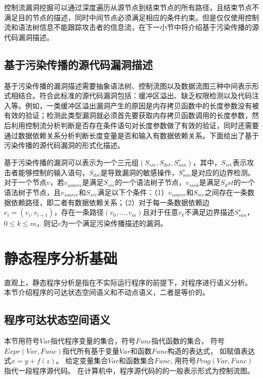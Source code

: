 控制流漏洞挖掘可以通过深度遍历从源节点到结束节点的所有路径，且结束节点不满足目的节点的描述，同时中间节点必须满足相应的条件约束。但是仅仅使用控制流和语法树信息不能跟踪攻击者的信息流，在下一小节中将介绍基于污染传播的源代码漏洞描述。

\subsection{基于污染传播的源代码漏洞描述}

基于污染传播的漏洞描述需要抽象语法树、控制流图以及数据流图三种中间表示形式相结合。符合此标准的源代码漏洞包括：缓冲区溢出、缺乏权限检测以及代码注入等。例如，一类缓冲区溢出漏洞产生的原因是内存拷贝函数中的长度参数没有被有效的验证；检测此类型漏洞就必须首先要获取内存拷贝函数调用的长度参数，然后利用控制流分析判断是否存在条件语句对长度参数做了有效的验证，同时还需要通过数据依赖关系分析判断长度变量是否和输入有数据依赖关系。下面给出了基于污染传播的源代码漏洞的形式化描述。

\begin{definition}
\label{基于污染传播的源代码漏洞描述}
基于污染传播的漏洞可以表示为一个三元组$(S_{src},S_{dst},S^{s}_{san})$，其中，$S_{src}$表示攻击者能够控制的输入语句，$S_{dst}$是导致漏洞的敏感操作，$S^{s}_{san}$是对应的边界检测。对于一个节点$v$，若$v_{source}$是满足$S_{src}$的一个语法树子节点，$v_{sink}$是满足$S_dst$的一个语法树子节点，且$v_{source}$和$S_{src}$满足以下个条件：（1）$v_{source}$和$S_{src}$之间存在一条数据依赖路径，即二者有数据依赖关系；（2）对于每一条数据依赖边$e_i = (v_i, v_{i+1})$，存在一条路径$(v_0,...,v_m)$且对于任意$v_k$不满足边界描述$S^{s}_{san}$，$0 \leq k \leq m$，则记$v$为一个满足污染传播描述的漏洞。
\end{definition}

\section{静态程序分析基础}

直观上，静态程序分析是指在不实际运行程序的前提下，对程序进行语义分析。
本节介绍程序的可达状态空间语义和不动点语义，二者是等价的。

\subsection{程序可达状态空间语义}

本节用符号$Var$指代程序变量的集合，符号$Func$指代函数的集合，
符号$Expr(Var, Func)$指代所有基于变量$Var$和函数$Func$构造的表达式，
如赋值表达式$x = y + f(z)$。
给定变量集合$Var$和函数集合$Func$, 用符号$Prog(Var, Func)$指代一段程序源代码。
在计算机中，程序源代码的的一般表示形式为控制流图。

